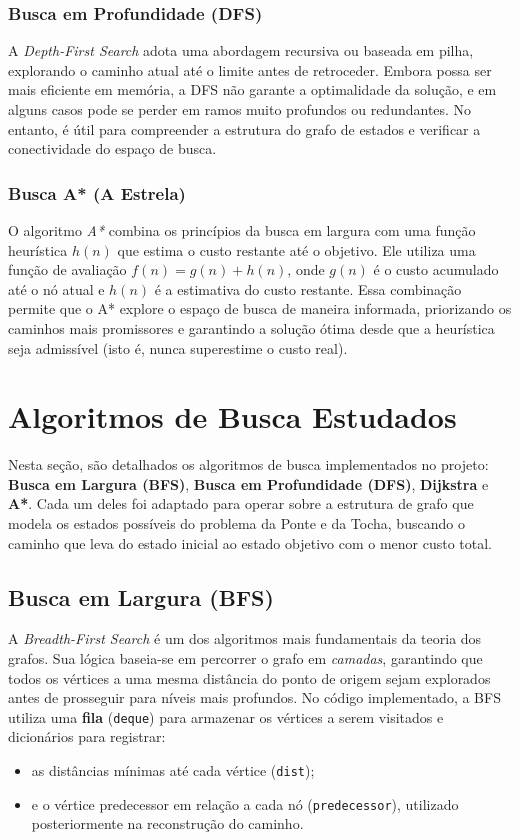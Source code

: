 \documentclass[12pt,a4paper]{article}
\begin{document}
\subsubsection{Busca em Profundidade (DFS)} 
A \textit{Depth-First Search} adota uma abordagem recursiva ou baseada em pilha, explorando o caminho atual até o limite antes de retroceder. 
Embora possa ser mais eficiente em memória, a DFS não garante a optimalidade da solução, e em alguns casos pode se perder em ramos muito profundos ou redundantes. No entanto, é útil para compreender a estrutura do grafo de estados e verificar a conectividade do espaço de busca.

\subsubsection{Busca A* (A Estrela)} 
O algoritmo \textit{A*} combina os princípios da busca em largura com uma função heurística $h(n)$ que estima o custo restante até o objetivo. 
Ele utiliza uma função de avaliação $f(n) = g(n) + h(n)$, onde $g(n)$ é o custo acumulado até o nó atual e $h(n)$ é a estimativa do custo restante. 
Essa combinação permite que o A* explore o espaço de busca de maneira informada, priorizando os caminhos mais promissores e garantindo a solução ótima desde que a heurística seja admissível (isto é, nunca superestime o custo real).

\section{Algoritmos de Busca Estudados}
Nesta seção, são detalhados os algoritmos de busca implementados no projeto: \textbf{Busca em Largura (BFS)}, \textbf{Busca em Profundidade (DFS)}, \textbf{Dijkstra} e \textbf{A*}. 
Cada um deles foi adaptado para operar sobre a estrutura de grafo que modela os estados possíveis do problema da Ponte e da Tocha, buscando o caminho que leva do estado inicial ao estado objetivo com o menor custo total.

\subsection{Busca em Largura (BFS)}
A \textit{Breadth-First Search} é um dos algoritmos mais fundamentais da teoria dos grafos. Sua lógica baseia-se em percorrer o grafo em \textit{camadas}, garantindo que todos os vértices a uma mesma distância do ponto de origem sejam explorados antes de prosseguir para níveis mais profundos. 
No código implementado, a BFS utiliza uma \textbf{fila} (\texttt{deque}) para armazenar os vértices a serem visitados e dicionários para registrar:
\begin{itemize}
    \item as distâncias mínimas até cada vértice (\texttt{dist});
    \item e o vértice predecessor em relação a cada nó (\texttt{predecessor}), utilizado posteriormente na reconstrução do caminho.
\end{itemize}
\end{document}
